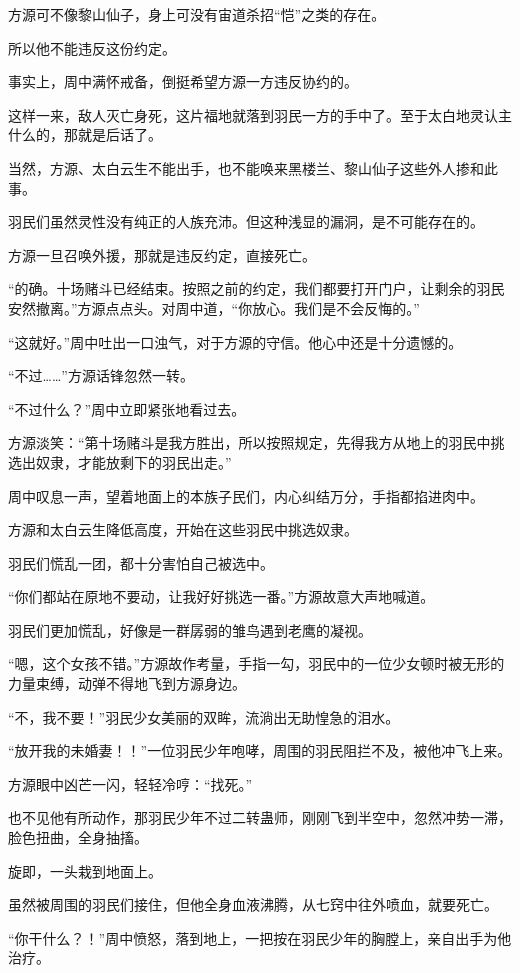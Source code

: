 \begin{this_body}
方源可不像黎山仙子，身上可没有宙道杀招“恺”之类的存在。

所以他不能违反这份约定。

事实上，周中满怀戒备，倒挺希望方源一方违反协约的。

这样一来，敌人灭亡身死，这片福地就落到羽民一方的手中了。至于太白地灵认主什么的，那就是后话了。

当然，方源、太白云生不能出手，也不能唤来黑楼兰、黎山仙子这些外人掺和此事。

羽民们虽然灵性没有纯正的人族充沛。但这种浅显的漏洞，是不可能存在的。

方源一旦召唤外援，那就是违反约定，直接死亡。

“的确。十场赌斗已经结束。按照之前的约定，我们都要打开门户，让剩余的羽民安然撤离。”方源点点头。对周中道，“你放心。我们是不会反悔的。”

“这就好。”周中吐出一口浊气，对于方源的守信。他心中还是十分遗憾的。

“不过……”方源话锋忽然一转。

“不过什么？”周中立即紧张地看过去。

方源淡笑：“第十场赌斗是我方胜出，所以按照规定，先得我方从地上的羽民中挑选出奴隶，才能放剩下的羽民出走。”

周中叹息一声，望着地面上的本族子民们，内心纠结万分，手指都掐进肉中。

方源和太白云生降低高度，开始在这些羽民中挑选奴隶。

羽民们慌乱一团，都十分害怕自己被选中。

“你们都站在原地不要动，让我好好挑选一番。”方源故意大声地喊道。

羽民们更加慌乱，好像是一群孱弱的雏鸟遇到老鹰的凝视。

“嗯，这个女孩不错。”方源故作考量，手指一勾，羽民中的一位少女顿时被无形的力量束缚，动弹不得地飞到方源身边。

“不，我不要！”羽民少女美丽的双眸，流淌出无助惶急的泪水。

“放开我的未婚妻！！”一位羽民少年咆哮，周围的羽民阻拦不及，被他冲飞上来。

方源眼中凶芒一闪，轻轻冷哼：“找死。”

也不见他有所动作，那羽民少年不过二转蛊师，刚刚飞到半空中，忽然冲势一滞，脸色扭曲，全身抽搐。

旋即，一头栽到地面上。

虽然被周围的羽民们接住，但他全身血液沸腾，从七窍中往外喷血，就要死亡。

“你干什么？！”周中愤怒，落到地上，一把按在羽民少年的胸膛上，亲自出手为他治疗。


\end{this_body}
